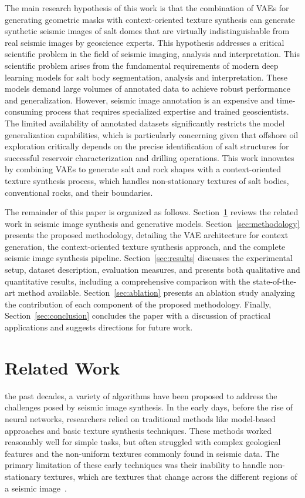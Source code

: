 \documentclass{ieeeaccess}
\begin{document}
The main research hypothesis of this work is that the combination of VAEs for generating geometric masks with context-oriented texture synthesis can generate synthetic seismic images of salt domes that are virtually indistinguishable from real seismic images by geoscience experts. This hypothesis addresses a critical scientific problem in the field of seismic imaging, analysis and interpretation. This scientific problem arises from the fundamental requirements of modern deep learning models for salt body segmentation, analysis and interpretation. These models demand large volumes of annotated data to achieve robust performance and generalization. However, seismic image annotation is an expensive and time-consuming process that requires specialized expertise and trained geoscientists. The limited availability of annotated datasets significantly restricts the model generalization capabilities, which is particularly concerning given that offshore oil exploration critically depends on the precise identification of salt structures for successful reservoir characterization and drilling operations. This work innovates by combining VAEs to generate salt and rock shapes with a context-oriented texture synthesis process, which handles non-stationary textures of salt bodies, conventional rocks, and their boundaries. 

The remainder of this paper is organized as follows. Section~\ref{sec:related} reviews the related work in seismic image synthesis and generative models. Section~\ref{sec:methodology} presents the proposed methodology, detailing the VAE architecture for context generation, the context-oriented texture synthesis approach, and the complete seismic image  synthesis pipeline. Section~\ref{sec:results} discusses the experimental setup, dataset description, evaluation measures, and presents both qualitative and quantitative results, including a comprehensive comparison with the state-of-the-art method available. Section~\ref{sec:ablation} presents an ablation study analyzing the contribution of each component of the proposed methodology. Finally, Section~\ref{sec:conclusion} concludes the paper with a discussion of practical applications and suggests directions for future work.


\section{Related Work}
\label{sec:related}

 the past decades, a variety of algorithms have been proposed to address the challenges posed by seismic image synthesis. In the early days, before the rise of neural networks, researchers relied on traditional methods like model-based approaches and basic texture synthesis techniques. These methods worked reasonably well for simple tasks,  but often struggled with complex geological features and the non-uniform textures commonly found in seismic data. The primary limitation of these early techniques was their inability to handle non-stationary textures, which are textures that change across the different regions of a seismic image~\cite{Zhou2018}.
\end{document}
